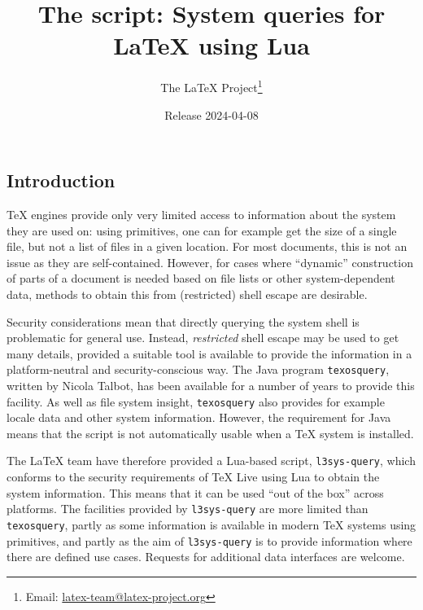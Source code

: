 \documentclass{l3doc}
\begin{document}
\title{The  script: System queries for LaTeX using Lua}

\author{%
  The \LaTeX{} Project\thanks{%
    Email: \href{mailto:latex-team@latex-project.org}
      {latex-team@latex-project.org}%
  }%
}

\date{Release 2024-04-08}

\maketitle
\tableofcontents

\begin{documentation}

\section{Introduction}

\TeX{} engines provide only very limited access to information about the system
they are used on: using primitives, one can for example get the size of a single
file, but not a list of files in a given location. For most documents, this is
not an issue as they are self-contained. However, for cases where
\enquote{dynamic} construction of parts of a document is needed based on file
lists or other system-dependent data, methods to obtain this from (restricted)
shell escape are desirable.

Security considerations mean that directly querying the system shell is
problematic for general use. Instead, \emph{restricted} shell escape may be used
to get many details, provided a suitable tool is available to provide the
information in a platform-neutral and security-conscious way. The Java program
\texttt{texosquery}, written by Nicola Talbot, has been available for a number
of years to provide this facility. As well as file system insight,
\texttt{texosquery} also provides for example locale data and other system
information. However, the requirement for Java means that the script is not
automatically usable when a \TeX{} system is installed.

The \LaTeX{} team have therefore provided a Lua-based script,
\texttt{l3sys-query}, which conforms to the security requirements of \TeX{} Live
using Lua to obtain the system information. This means that it can be used
\enquote{out of the box} across platforms. The facilities provided by
\texttt{l3sys-query} are more limited than \texttt{texosquery}, partly as some
information is available in modern \TeX{} systems using primitives, and partly
as the aim of \texttt{l3sys-query} is to provide information where there are
defined use cases. Requests for additional data interfaces are welcome.


\end{documentation}
\end{document}
